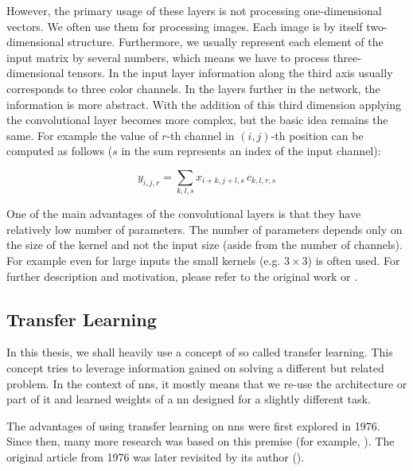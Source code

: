 However, the primary usage of these layers is not processing one-dimensional vectors. We often use them for processing images. Each image is by itself two-dimensional structure. Furthermore, we usually represent each element of the input matrix by several numbers, which means we have to process three-dimensional tensors. In the input layer information along the third axis usually corresponds to three color channels. In the layers further in the network, the information is more abstract. With the addition of this third dimension applying the convolutional layer becomes more complex, but the basic idea remains the same. For example the value of $r$-th channel in $(i, j)$-th position can be computed as follows ($s$ in the sum represents an index of the input channel):

$$y_{i, j, r} = \sum_{k, l, s} x_{i+k, j+l, s} \, c_{k, l, r, s}$$

One of the main advantages of the convolutional layers is that they have relatively low number of parameters. The number of parameters depends only on the size of the kernel and not the input size (aside from the number of channels). For example even for large inputs the small kernels (e.g. $3 \times 3$) is often used. For further description and motivation, please refer to the original work or \cite{deeplearningbook}.

\subsection{Transfer Learning}

\label{ssec:transfer_learning}

In this thesis, we shall heavily use a concept of so called transfer learning. This concept tries to leverage information gained on solving a different but related problem. In the context of \glspl{nn}, it mostly means that we re-use the architecture or part of it and learned weights of a \gls{nn} designed for a slightly different task.


The advantages of using transfer learning on \glspl{nn} were first explored in 1976. Since then, many more research was based on this premise (for example, \cite{transferlearning}). The original article from 1976 was later revisited by its author (\cite{transferreviewed}).

